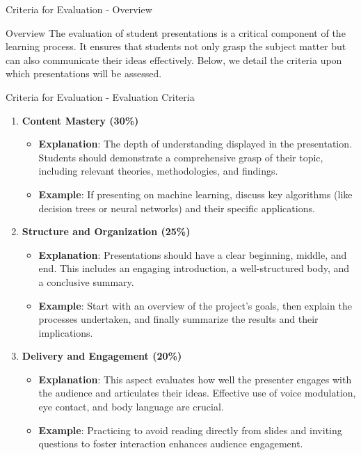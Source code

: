 \documentclass[aspectratio=169]{beamer}
\begin{document}
\begin{frame}[fragile]{Criteria for Evaluation - Overview}
    \begin{block}{Overview}
        The evaluation of student presentations is a critical component of the learning process. It ensures that students not only grasp the subject matter but can also communicate their ideas effectively. Below, we detail the criteria upon which presentations will be assessed.
    \end{block}
\end{frame}

\begin{frame}[fragile]{Criteria for Evaluation - Evaluation Criteria}
    \begin{enumerate}
        \item \textbf{Content Mastery (30\%)}
            \begin{itemize}
                \item \textbf{Explanation}: The depth of understanding displayed in the presentation. Students should demonstrate a comprehensive grasp of their topic, including relevant theories, methodologies, and findings.
                \item \textbf{Example}: If presenting on machine learning, discuss key algorithms (like decision trees or neural networks) and their specific applications.
            \end{itemize}
        
        \item \textbf{Structure and Organization (25\%)}
            \begin{itemize}
                \item \textbf{Explanation}: Presentations should have a clear beginning, middle, and end. This includes an engaging introduction, a well-structured body, and a conclusive summary.
                \item \textbf{Example}: Start with an overview of the project’s goals, then explain the processes undertaken, and finally summarize the results and their implications.
            \end{itemize}
        
        \item \textbf{Delivery and Engagement (20\%)}
            \begin{itemize}
                \item \textbf{Explanation}: This aspect evaluates how well the presenter engages with the audience and articulates their ideas. Effective use of voice modulation, eye contact, and body language are crucial.
                \item \textbf{Example}: Practicing to avoid reading directly from slides and inviting questions to foster interaction enhances audience engagement.
            \end{itemize}
    \end{enumerate}
\end{frame}
\end{document}
